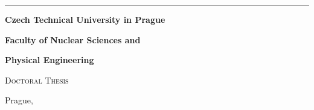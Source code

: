 {\begin{titlepage}
\begin{minipage}[b][\textheight]{0.15\textwidth}
    \end{minipage}
    \hspace{0.05\textwidth}
    \doccol \rule{2pt}{\textheight}
    \hspace{0.05\textwidth}
    \begin{minipage}[b][\textheight]{0.7\textwidth}
      \begin{minipage}[b]{\textwidth}
        \centering \doccol \Large
        \textbf{Czech Technical University in Prague} \par
        \textbf{Faculty of Nuclear Sciences and} \par
        \textbf{Physical Engineering}
      \end{minipage} \par
      \vfill
      \begin{minipage}[b]{\textwidth}
        \centering \doccol \huge \textsc{Doctoral Thesis}
      \end{minipage} \par
      \vspace{1cm}
      \begin{minipage}[b]{\textwidth}
        \centering  \doccol \huge \textbf{\@title}
      \end{minipage} \par
      \vfill
      \begin{minipage}[b]{0.95\textwidth}
        Prague, \@Year
        \hfill
        \@Author
      \end{minipage}
    \end{minipage}
  \end{titlepage}
  \cleardoublepage

}
